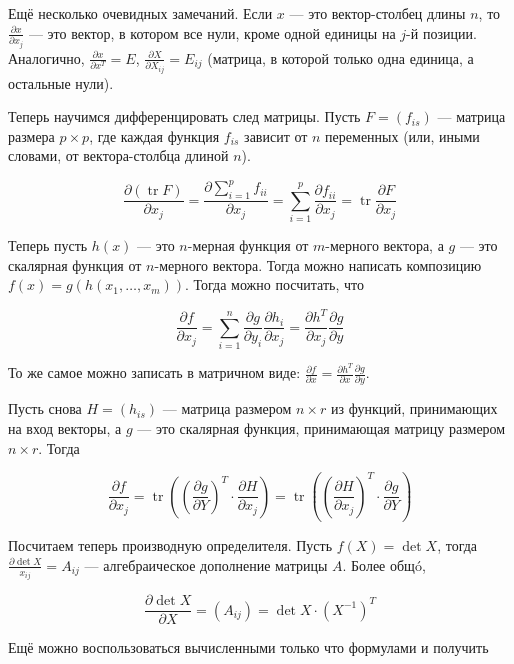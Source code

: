 \documentclass[12pt]{article}
\begin{document}
Ещё несколько очевидных замечаний. Если $x$ — это вектор-столбец длины $n$, то $\frac {\partial x} {\partial x_j}$ — это вектор, в котором все нули, кроме одной единицы на $j$-й позиции. Аналогично, $\frac {\partial x} {\partial x^T} = E$, $\frac {\partial X} {\partial X_{ij}} = E_{ij}$ (матрица, в которой только одна единица, а остальные нули).

Теперь научимся дифференцировать след матрицы. Пусть $F = (f_{is})$ — матрица размера $p \times p$, где каждая функция $f_{is}$ зависит от $n$ переменных (или, иными словами, от вектора-столбца длиной $n$).

\[
\frac {\partial (\operatorname{tr} F)} {\partial x_{j}} =
\frac {\partial \sum_{i=1}^p f_{ii}} {\partial x_{j}} =
\sum_{i=1}^p \frac {\partial f_{ii}} {\partial x_j} =
\operatorname{tr} \frac {\partial F} {\partial x_j}
\]

Теперь пусть $h(x)$ — это $n$-мерная функция от $m$-мерного вектора, а $g$ — это скалярная функция от $n$-мерного вектора. Тогда можно написать композицию $f(x) = g(h(x_1, \ldots, x_m))$. Тогда можно посчитать, что

\[
\frac {\partial f} {\partial x_j} =
\sum_{i=1}^n \frac {\partial g} {\partial y_i} \frac {\partial h_i} {\partial x_j} =
\frac {\partial h^T} {\partial x_j} \frac {\partial g} {\partial y}
\]

То же самое можно записать в матричном виде: $\frac {\partial f} {\partial x} = \frac {\partial h^T} {\partial x} \frac {\partial g} {\partial y}$.

Пусть снова $H = (h_{is})$ — матрица размером $n \times r$ из функций, принимающих на вход векторы, а $g$ — это скалярная функция, принимающая матрицу размером $n \times r$. Тогда

\[
\frac {\partial f} {\partial x_j} =
\operatorname{tr} \left( \left( \frac {\partial g} {\partial Y} \right)^T \cdot \frac {\partial H} {\partial x_j} \right) =
\operatorname{tr} \left( \left( \frac {\partial H} {\partial x_j} \right)^T \cdot \frac {\partial g} {\partial Y} \right)
\]

Посчитаем теперь производную определителя. Пусть $f(X) = \operatorname{det} X$, тогда $\frac {\partial \det X} {x_{ij}} = A_{ij}$ — алгебраическое дополнение матрицы $A$. Более общó,

\[
\frac {\partial \det X} {\partial X} = (A_{ij}) =
\det X \cdot \left( X^{-1} \right)^T
\]

Ещё можно воспользоваться вычисленными только что формулами и получить
\end{document}
